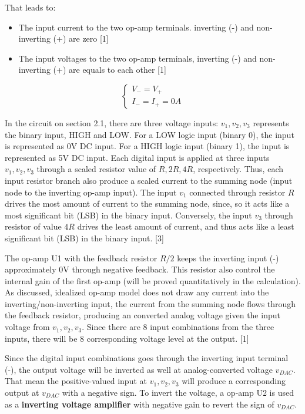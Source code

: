 \documentclass[12pt]{article}
\begin{document}
    That leads to: 
    \begin{itemize}
        \item The input current to the two op-amp terminals. inverting (-) and non-inverting (+) are zero [1]
        \item The input voltages to the two op-amp terminals, inverting (-) and non-inverting (+) are equals to each other [1]
    \end{itemize}

    \begin{equation*}
        \begin{cases}
            V_-=V_+ \\ 
            I_-=I_+=0A
        \end{cases}
    \end{equation*}

    In the circuit on section 2.1, there are three voltage inputs: \(v_1,v_2,v_3\) represents the binary input, HIGH and LOW. For a LOW logic input (binary 0), the input is represented as 0V DC input. For a HIGH logic input (binary 1), the input is represented as 5V DC input. Each digital input is applied at three inputs \(v_1,v_2,v_3\) through a scaled resistor value of \(R,2R,4R\), respectively. Thus, each input resistor branch also produce a scaled current to the summing node (input node to the inverting op-amp input). The input \(v_1\) connected through resistor \(R\) drives the most amount of current to the summing node, since, so it acts like a most significant bit (LSB) in the binary input. Conversely, the input \(v_3\) through resistor of value \(4R\) drives the least amount of current, and thus acts like a least significant bit (LSB) in the binary input. [3]


    The op-amp U1 with the feedback resistor \(R/2\) keeps the inverting input (-) approximately 0V  through negative feedback. This resistor also control the internal gain of the first op-amp (will be proved quantitatively in the calculation). As discussed, idealized op-amp model does not draw any current into the inverting/non-inverting input, the current from the summing node flows through the feedback resistor, producing an converted analog voltage given the input voltage from \(v_1,v_2,v_3\). Since there are 8 input combinations from the three inputs, there will be 8 corresponding voltage level at the output. [1]


    Since the digital input combinations goes through the inverting input terminal (-), the output voltage will be inverted as well at analog-converted voltage \(v_{DAC}\). That mean the positive-valued input at \(v_1,v_2,v_3\) will produce a corresponding output at \(v_{DAC}\) with a negative sign. To invert the voltage, a op-amp U2 is used as a \textbf{inverting voltage amplifier} with negative gain to revert the sign of \(v_{DAC}\). 
\end{document}
